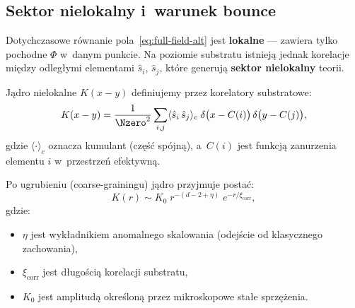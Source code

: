 \subsection{Sektor nielokalny i~warunek bounce}\label{ssec:nielokalny}

Dotychczasowe r\'ownanie pola~\eqref{eq:full-field-alt} jest
\textbf{lokalne} --- zawiera tylko pochodne $\Phi$ w~danym punkcie.
Na poziomie substratu istniej\k{a} jednak korelacje
mi\k{e}dzy odleg\l{}ymi elementami $\hat{s}_i$, $\hat{s}_j$,
kt\'ore generuj\k{a} \textbf{sektor nielokalny} teorii.

\begin{definition}\label{def:kernel}
J\k{a}dro nielokalne $K(x-y)$ definiujemy przez korelatory
substratowe:
\begin{equation}\label{eq:kernel-def}
  K(x - y) = \frac{1}{\Nzero^2}\sum_{i,j}
  \langle\hat{s}_i\,\hat{s}_j\rangle_c\;
  \delta\bigl(x - C(i)\bigr)\,\delta\bigl(y - C(j)\bigr),
\end{equation}
gdzie $\langle\cdot\rangle_c$ oznacza kumulant (cz\k{e}\'s\'c
sp\'ojn\k{a}), a~$C(i)$ jest funkcj\k{a} zanurzenia elementu $i$
w~przestrze\'n efektywn\k{a}.
\end{definition}

\begin{proposition}\label{prop:kernel-form}
Po ugrubieniu (coarse-grainingu) j\k{a}dro przyjmuje posta\'c:
\begin{equation}\label{eq:kernel-coarse}
  K(r) \sim K_0\;r^{-(d-2+\eta)}\;
  e^{-r/\xi_{\mathrm{corr}}},
\end{equation}
gdzie:
\begin{itemize}[nosep]
  \item $\eta$ jest wyk\l{}adnikiem anomalnego skalowania
    (odej\'scie od klasycznego zachowania),
  \item $\xi_{\mathrm{corr}}$ jest d\l{}ugo\'sci\k{a} korelacji
    substratu,
  \item $K_0$ jest amplitud\k{a} okre\'slon\k{a} przez
    mikroskopowe sta\l{}e sprz\k{e}\.zenia.
\end{itemize}
\end{proposition}

